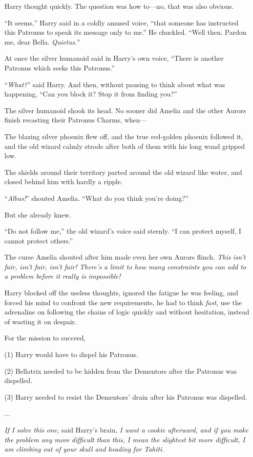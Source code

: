 Harry thought quickly. The question was how to—no, that was also obvious.

“It seems,” Harry said in a coldly amused voice, “that someone has instructed this Patronus to speak its message only to me.” He chuckled. “Well then. Pardon me, dear Bella. \emph{Quietus.}”

At once the silver humanoid said in Harry’s own voice, “There is another Patronus which seeks this Patronus.”

“\emph{What?}” said Harry. And then, without pausing to think about what was happening, “Can you block it? Stop it from finding you?”

The silver humanoid shook its head.
\sbreak
No sooner did Amelia and the other Aurors finish recasting their Patronus Charms, when—

The blazing silver phoenix flew off, and the true red-golden phoenix followed it, and the old wizard calmly strode after both of them with his long wand gripped low.

The shields around their territory parted around the old wizard like water, and closed behind him with hardly a ripple.

“\emph{Albus!}” shouted Amelia. “What do you think you’re doing?”

But she already knew.

“Do not follow me,” the old wizard’s voice said sternly. “I can protect myself, I cannot protect others.”

The curse Amelia shouted after him made even her own Aurors flinch.
\sbreak
\emph{This isn’t fair, isn’t fair, isn’t fair! There’s a limit to how many constraints you can add to a problem before it really is impossible!}

Harry blocked off the useless thoughts, ignored the fatigue he was feeling, and forced his mind to confront the new requirements, he had to think \emph{fast,} use the adrenaline on following the chains of logic quickly and without hesitation, instead of wasting it on despair.

For the mission to succeed,

(1) Harry would have to dispel his Patronus.

(2) Bellatrix needed to be hidden from the Dementors after the Patronus was dispelled.

(3) Harry needed to resist the Dementors’ drain after his Patronus was dispelled.

...

\emph{If I solve this one,} said Harry’s brain, \emph{I want a cookie afterward, and if you make the problem any more difficult than this, I mean the slightest bit more difficult, I am climbing out of your skull and heading for Tahiti.}

